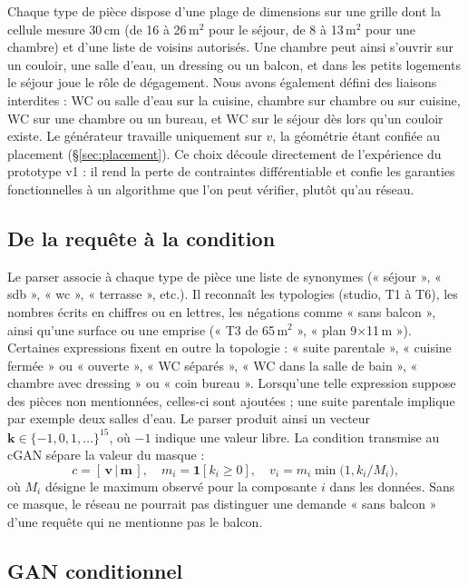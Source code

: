 \documentclass[twocolumn]{ICCKjournal}
\begin{document}
Chaque type de pièce dispose d'une plage de dimensions sur une grille
dont la cellule mesure 30\,cm (de 16 à 26\,m$^2$ pour le séjour, de 8 à
13\,m$^2$ pour une chambre) et d'une liste de voisins autorisés. Une
chambre peut ainsi s'ouvrir sur un couloir, une salle d'eau, un dressing
ou un balcon, et dans les petits logements le séjour joue le rôle de
dégagement. Nous avons également défini des liaisons interdites : WC ou
salle d'eau sur la cuisine, chambre sur chambre ou sur cuisine, WC sur
une chambre ou un bureau, et WC sur le séjour dès lors qu'un couloir
existe. Le générateur travaille uniquement sur $v$, la géométrie étant
confiée au placement (§\ref{sec:placement}). Ce choix découle
directement de l'expérience du prototype v1 : il rend la perte de
contraintes différentiable et confie les garanties fonctionnelles à un
algorithme que l'on peut vérifier, plutôt qu'au réseau.

\subsection{De la requête à la condition}

Le parser associe à chaque type de pièce une liste de synonymes
(« séjour », « sdb », « wc », « terrasse », etc.). Il reconnaît les
typologies (studio, T1 à T6), les nombres écrits en chiffres ou en
lettres, les négations comme « sans balcon », ainsi qu'une surface ou
une emprise (« T3 de 65\,m$^2$ », « plan 9$\times$11\,m »). Certaines
expressions fixent en outre la topologie : « suite parentale »,
« cuisine fermée » ou « ouverte », « WC séparés », « WC dans la salle de
bain », « chambre avec dressing » ou « coin bureau ». Lorsqu'une telle
expression suppose des pièces non mentionnées, celles-ci sont ajoutées ;
une suite parentale implique par exemple deux salles d'eau. Le parser
produit ainsi un vecteur $\mathbf{k}\in\{-1,0,1,\dots\}^{15}$, où $-1$
indique une valeur libre. La condition transmise au cGAN sépare la
valeur du masque :
\begin{equation}
  c = [\,\mathbf{v}\,|\,\mathbf{m}\,],\quad
  m_i = \mathbf{1}[k_i \ge 0],\quad
  v_i = m_i \min\!\big(1, k_i / M_i\big),
\end{equation}
où $M_i$ désigne le maximum observé pour la composante $i$ dans les
données. Sans ce masque, le réseau ne pourrait pas distinguer une
demande « sans balcon » d'une requête qui ne mentionne pas le balcon.

\subsection{GAN conditionnel}
\end{document}

